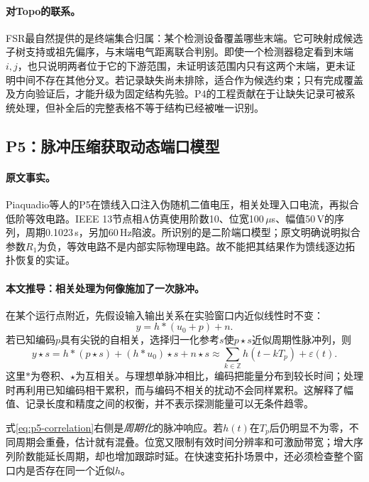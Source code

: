 \documentclass[UTF8,11pt,fontset=fandol]{ctexart}
\theoremstyle{remark}
\numberwithin{equation}{section}
\begin{document}
\paragraph{对Topo的联系。}
FSR最自然提供的是终端集合归属：某个检测设备覆盖哪些末端。它可映射成候选子树支持或祖先偏序，与末端电气距离联合判别。即使一个检测器稳定看到末端$i,j$，也只说明两者位于它的下游范围，未证明该范围内只有这两个末端，更未证明中间不存在其他分叉。若记录缺失尚未排除，适合作为候选约束；只有完成覆盖及方向验证后，才能升级为固定结构先验。P4的工程贡献在于让缺失记录可被系统处理，但补全后的完整表格不等于结构已经被唯一识别。

\subsection{P5：脉冲压缩获取动态端口模型}
\label{subsec:P5}

\paragraph{原文事实。}
Piaquadio等人的P5\citep{P5}在馈线入口注入伪随机二值电压，相关处理入口电流，再拟合低阶等效电路。IEEE 13节点相A仿真使用阶数10、位宽100\,$\mu$s、幅值50\,V的序列，周期0.1023\,s，另加60\,Hz陷波。所识别的是二阶端口模型；原文明确说明拟合参数$R_1$为负，等效电路不是内部实际物理电路。故不能把其结果作为馈线逐边拓扑恢复的实证。

\paragraph{本文推导：相关处理为何像施加了一次脉冲。}
在某个运行点附近，先假设输入输出关系在实验窗口内近似线性时不变：
\begin{equation}
 y=h*(u_0+p)+n.
 \label{eq:p5-lti}
\end{equation}
若已知编码$p$具有尖锐的自相关，选择归一化参考$s$使$p\star s$近似周期性脉冲列，则
\begin{equation}
 y\star s=h*(p\star s)+(h*u_0)\star s+n\star s
 \approx\sum_{k\in\mathbb Z}h(t-kT_p)+\varepsilon(t).
 \label{eq:p5-correlation}
\end{equation}
这里$*$为卷积、$\star$为互相关。与理想单脉冲相比，编码把能量分布到较长时间；处理时再利用已知编码相干累积，而与编码不相关的扰动不会同样累积。这解释了幅值、记录长度和精度之间的权衡，并不表示探测能量可以无条件趋零。

式\eqref{eq:p5-correlation}右侧是\emph{周期化}的脉冲响应。若$h(t)$在$T_p$后仍明显不为零，不同周期会重叠，估计就有混叠。位宽又限制有效时间分辨率和可激励带宽；增大序列阶数能延长周期，却也增加跟踪时延。在快速变拓扑场景中，还必须检查整个窗口内是否存在同一个近似$h$。
\end{document}
